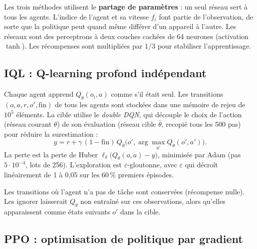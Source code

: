 \documentclass[11pt,a4paper]{article}
\begin{document}
Les trois méthodes utilisent le \textbf{partage de paramètres} : un seul réseau sert à tous les agents.
L'indice de l'agent et sa vitesse $f_i$ font partie de l'observation, de sorte que la politique peut quand même
différer d'un appareil à l'autre. Les réseaux sont des perceptrons à deux couches cachées de 64 neurones
(activation $\tanh$). Les récompenses sont multipliées par $1/3$ pour stabiliser l'apprentissage.

\subsection{IQL : Q-learning profond indépendant}

Chaque agent apprend $Q_\theta(o_i,a)$ comme s'il était seul. Les transitions $(o,a,r,o',\mathrm{fin})$ de tous
les agents sont stockées dans une mémoire de rejeu de $10^5$ éléments. La cible utilise le \emph{double DQN},
qui découple le choix de l'action (réseau courant $\theta$) de son évaluation (réseau cible $\bar\theta$, recopié
tous les 500 pas) pour réduire la surestimation :
\begin{equation}
  y = r + \gamma\,(1-\mathrm{fin})\,Q_{\bar\theta}\bigl(o',\arg\max_{a'}Q_\theta(o',a')\bigr).
\end{equation}
La perte est la perte de Huber $\ell_\delta\bigl(Q_\theta(o,a)-y\bigr)$, minimisée par Adam (pas $5\cdot10^{-4}$,
lots de 256). L'exploration est $\varepsilon$-gloutonne, avec $\varepsilon$ qui décroît linéairement de 1 à
0{,}05 sur les 60\,\% premiers épisodes.

Les transitions où l'agent n'a pas de tâche sont conservées (récompense nulle). Les ignorer laisserait $Q_\theta$
non entraîné sur ces observations, alors qu'elles apparaissent comme états suivants $o'$ dans la cible.

\subsection{PPO : optimisation de politique par gradient}
\end{document}
